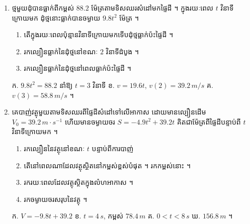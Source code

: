 \begin{enumerate}[1]
  \begin{center}
  \end{center}
  \ans
  កម្ពស់ប្រអប់ $h = \dfrac{x}{\sqrt{3}}$ និងជ្រុងបាត $a - 2x$ ។ មាឌ $V = \dfrac{\sqrt{3}}{4}(a - 2x)^2\cdot\dfrac{x}{\sqrt{3}} = \dfrac{1}{4}x(a - 2x)^2$, $0 < x < \dfrac{a}{2}$ ។ $V' = \dfrac{1}{4}(a - 2x)(a - 6x) = 0$ នាំឱ្យ $x = \dfrac{a}{6}$ ។ មាឌធំបំផុត $V = \dfrac{a^3}{54}$ ។
  \item ថ្មមួយដុំបានធ្លាក់ពីកម្ពស់ $88.2$ ម៉ែត្រតាមទិសឈរសំដៅមកផ្ទៃដី ។ ក្នុងរយៈពេល $t$ វិនាទីក្រោយមក ដុំថ្មនោះធ្លាក់បានចម្ងាយ $9.8t^2$ ម៉ែត្រ ។
  \begin{enumerate}[a]
    \item តើក្នុងរយៈពេលប៉ុន្មានវិនាទីក្រោយមកទើបដុំថ្មធ្លាក់ប៉ះផ្ទៃដី ។
    \item រកល្បឿនធ្លាក់នៃដុំថ្មនៅខណៈ $2$ វិនាទីដំបូង ។
    \item រកល្បឿនធ្លាក់នៃដុំថ្មនៅពេលធ្លាក់ប៉ះផ្ទៃដី ។
  \end{enumerate}
  \ans
  ក. $9.8t^2 = 88.2$ នាំឱ្យ $t = 3$ វិនាទី \quad ខ. $v = 19.6t$, $v(2) = 39.2\,m/s$ \quad គ. $v(3) = 58.8\,m/s$ ។
  \item គេបាញ់វត្ថុមួយតាមទិសឈរពីផ្ទៃដីសំដៅទៅលើអាកាស ដោយមានល្បឿនដើម $V_0 = 39.2\,m\cdot s^{-1}$ ហើយមានចម្ងាយចរ $S = -4.9t^2 + 39.2t$ គិតជាម៉ែត្រពីផ្ទៃដីបន្ទាប់ពី $t$ វិនាទីក្រោយមក ។
  \begin{enumerate}[a]
    \item រកល្បឿននៃវត្ថុនៅខណៈ $t$ បន្ទាប់ពីការបាញ់
    \item តើនៅពេលណាដែលវត្ថុស្ថិតនៅកម្ពស់ខ្ពស់បំផុត ។ រកកម្ពស់នោះ ។
    \item រករយៈពេលដែលវត្ថុស្ថិតក្នុងលំហអាកាស ។
    \item រកចម្ងាយចរសរុបនៃវត្ថុ ។
  \end{enumerate}
  \ans
  ក. $V = -9.8t + 39.2$ \quad ខ. $t = 4\,s$, កម្ពស់ $78.4\,m$ \quad គ. $0 < t < 8\,s$ \quad ឃ. $156.8\,m$ ។
\end{enumerate}
